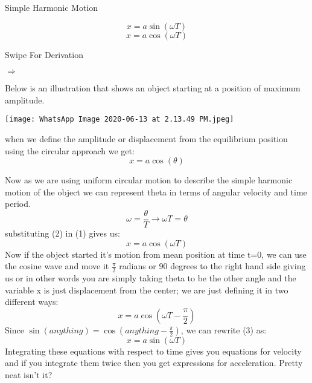 \documentclass{article}
\begin{document}
\pagecolor{Miscellaneous Blue}
\color{white}
\Huge
\begin{center}
Simple Harmonic Motion
\end{center}
\begin{equation}
    x = a\sin{(\omega T)} \nonumber
\end{equation}
\begin{equation}
    x = a\cos{(\omega T)} \nonumber
\end{equation}
\newline\newline
\begin{center}
 Swipe For Derivation\end{center}
 \begin{center}
  $\Rightarrow$       
 \end{center}


\newpage
\normalsize
\noindent Below is an illustration that shows an object starting at a position of maximum amplitude.\newline
\begin{center}
 \texttt{[image: WhatsApp Image 2020-06-13 at 2.13.49 PM.jpeg]}   
\end{center}
when we define the amplitude or displacement from the equilibrium position using the circular approach we get: 
\begin{equation}
x =  a\cos{(\theta)}   
\end{equation}


\noindent Now as we are using uniform circular motion to describe the simple harmonic motion of the object we can represent theta in terms of angular velocity and time period.
\begin{equation}
    \omega = \frac{\theta}{T} \to
    \omega T = \theta
\end{equation}
substituting (2) in (1) gives us:
\begin{equation}
    x = a\cos{(\omega T)}\nonumber
\end{equation}
Now if the object started it's motion from mean position at time t=0, we can use the cosine wave and move it $\frac{\pi}{2}$ radians or 90 degrees to the right hand side giving us or in other words you are simply taking theta to be the other angle and the variable x is just displacement from the center; we are just defining it in two different ways:
\begin{equation}
    x = a\cos{(\omega T-\frac{\pi}{2})}
\end{equation}
Since $\sin{(anything)} = \cos{(anything-\frac{\pi}{2})}$, we can rewrite (3) as:
\begin{equation}
    x = a\sin{(\omega T)}\nonumber
\end{equation}
Integrating these equations with respect to time gives you equations for velocity and if you integrate them twice then you get expressions for acceleration.
Pretty neat isn't it?
\end{document}
